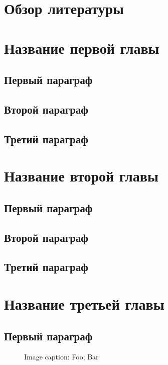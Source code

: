 \documentclass[a4paper]{report}
\begin{document}
	\chapter*{Обзор литературы}
	\lipsum[13-17]
	
	\chapter{Название первой главы}
	\lipsum[18-19]
	\section{Первый параграф}
	\lipsum[19-24]
	\section{Второй параграф}	
	\lipsum[24-29]
	\section{Третий параграф}
	\lipsum[29-34]
	
	\chapter{Название второй главы}
	\lipsum[35-36]
	\section{Первый параграф}
	\lipsum[37-42]
	\section{Второй параграф}	
	\lipsum[42-47]
	\section{Третий параграф}
	\lipsum[47-52]
		
	\chapter{Название третьей главы}
	\lipsum[52-53]
	\section{Первый параграф}
	\begin{figure}[h!]
		\centering
		\hspace{-2ex}
		\caption{Image caption:  Foo;  Bar}		
		\label{fig:double-foo-bar}		
	\end{figure}
	\lipsum[53-58]
\end{document}
